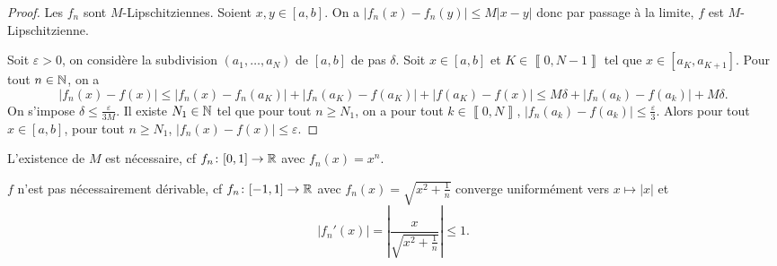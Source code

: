 \begin{proof}
    Les $f_{n}$ sont $M$-Lipschitziennes. Soient $x,y\in[a,b]$. On a $\left\lvert f_{n}(x)-f_{n}(y)\right\rvert\leqslant M\left\lvert x-y\right\rvert$ donc par passage à la limite, $f$ est $M$-Lipschitzienne. 
    
    Soit $\varepsilon>0$, on considère la subdivision $(a_{1},\dots,a_{N})$ de $[a,b]$ de pas $\delta$. Soit $x\in[a,b]$ et $K\in\left\llbracket0,N-1\right\rrbracket$ tel que $x\in[a_{K},a_{K+1}]$. Pour tout $n\in\mathbb{N}$, on a 
    \begin{equation}
        \left\lvert f_{n}(x)-f(x)\right\rvert\leqslant\left\lvert f_{n}(x)-f_{n}(a_{K})\right\rvert+\left\lvert f_{n}(a_{K})-f(a_{K})\right\rvert+\left\lvert f(a_{K})-f(x)\right\rvert\leqslant M\delta+\left\lvert f_{n}(a_{k})-f(a_{k})\right\rvert+M\delta.
    \end{equation}
    On s'impose $\delta\leqslant\frac{\varepsilon}{3M}$. Il existe $N_{1}\in\mathbb{N}$ tel que pour tout $n\geqslant N_{1}$, on a pour tout $k\in\left\llbracket0,N\right\rrbracket$, $\left\lvert f_{n}(a_{k})-f(a_{k})\right\rvert\leqslant\frac{\varepsilon}{3}$. Alors pour tout $x\in[a,b]$, pour tout $n\geqslant N_{1}$, $\left\lvert f_{n}(x)-f(x)\right\rvert\leqslant\varepsilon$.
\end{proof}

\begin{remark}
    L'existence de $M$ est nécessaire, cf $f_{n}\colon[0,1]\to\mathbb{R}$ avec $f_n(x)=x^{n}$.
\end{remark}

\begin{remark}
    $f$ n'est pas nécessairement dérivable, cf $f_{n}\colon[-1,1]\to\mathbb{R}$ avec $f_n(x)=\sqrt{x^{2}+\frac{1}{n}}$ converge uniformément vers $x\mapsto\left\lvert x\right\rvert$ et 
    \begin{equation}
        \left\lvert f_n'(x)\right\rvert=\left\lvert\frac{x}{\sqrt{x^{2}+\frac{1}{n}}}\right\rvert\leqslant1.
    \end{equation}
\end{remark}

